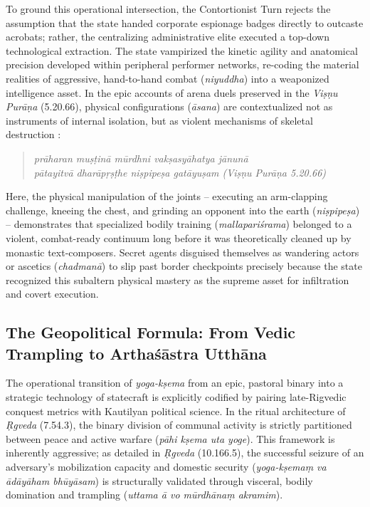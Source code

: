 \documentclass[11pt,twoside,letterpaper]{article}
\begin{document}
To ground this operational intersection, the Contortionist Turn rejects the assumption that the state handed corporate espionage badges directly to outcaste acrobats; rather, the centralizing administrative elite executed a top-down technological extraction. The state vampirized the kinetic agility and anatomical precision developed within peripheral performer networks, re-coding the material realities of aggressive, hand-to-hand combat (\textit{niyuddha}) into a weaponized intelligence asset. In the epic accounts of arena duels preserved in the \textit{Viṣṇu Purāṇa} (5.20.66), physical configurations (\textit{āsana}) are contextualized not as instruments of internal isolation, but as violent mechanisms of skeletal destruction \cite{ViP_5}:
\begin{quote}
    \textit{prāharan muṣṭinā mūrdhni vakṣasyāhatya jānunā} \\
    \textit{pātayitvā dharāpṛṣṭhe niṣpipeṣa gatāyuṣam (Viṣṇu Purāṇa 5.20.66)}
\end{quote}

Here, the physical manipulation of the joints -- executing an arm-clapping challenge, kneeing the chest, and grinding an opponent into the earth (\textit{niṣpipeṣa}) -- demonstrates that specialized bodily training (\textit{mallapariśrama}) belonged to a violent, combat-ready continuum long before it was theoretically cleaned up by monastic text-composers. Secret agents disguised themselves as wandering actors or ascetics (\textit{chadmanā}) to slip past border checkpoints precisely because the state recognized this subaltern physical mastery as the supreme asset for infiltration and covert execution.

\subsection{The Geopolitical Formula: From Vedic Trampling to Arthaśāstra Utthāna}

The operational transition of \textit{yoga-kṣema} from an epic, pastoral binary into a strategic technology of statecraft is explicitly codified by pairing late-Rigvedic conquest metrics with Kautilyan political science. In the ritual architecture of \textit{Ṛgveda} (7.54.3), the binary division of communal activity is strictly partitioned between peace and active warfare (\textit{pāhi kṣema uta yoge}). This framework is inherently aggressive; as detailed in \textit{Ṛgveda} (10.166.5), the successful seizure of an adversary’s mobilization capacity and domestic security (\textit{yoga-kṣemaṃ va ādāyāham bhūyāsam}) is structurally validated through visceral, bodily domination and trampling (\textit{uttama ā vo mūrdhānaṃ akramim}). 
\end{document}

